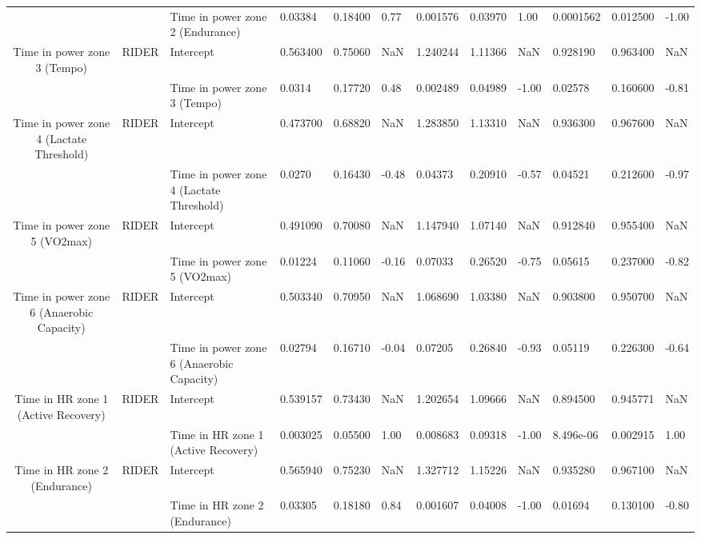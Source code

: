 \begin{tabular}{c}
                                      &       & Time in power zone 2 (Endurance) &   0.03384 &  0.18400 &  0.77 &  0.001576 &  0.03970 &  1.00 &  0.0001562 &  0.012500 & -1.00 \\
Time in power zone 3 (Tempo) & RIDER & Intercept &  0.563400 &  0.75060 &   NaN &  1.240244 &  1.11366 &   NaN &   0.928190 &  0.963400 &   NaN \\
                                      &       & Time in power zone 3 (Tempo) &    0.0314 &  0.17720 &  0.48 &  0.002489 &  0.04989 & -1.00 &    0.02578 &  0.160600 & -0.81 \\
Time in power zone 4 (Lactate Threshold) & RIDER & Intercept &  0.473700 &  0.68820 &   NaN &  1.283850 &  1.13310 &   NaN &   0.936300 &  0.967600 &   NaN \\
                                      &       & Time in power zone 4 (Lactate Threshold) &    0.0270 &  0.16430 & -0.48 &   0.04373 &  0.20910 & -0.57 &    0.04521 &  0.212600 & -0.97 \\
Time in power zone 5 (VO2max) & RIDER & Intercept &  0.491090 &  0.70080 &   NaN &  1.147940 &  1.07140 &   NaN &   0.912840 &  0.955400 &   NaN \\
                                      &       & Time in power zone 5 (VO2max) &   0.01224 &  0.11060 & -0.16 &   0.07033 &  0.26520 & -0.75 &    0.05615 &  0.237000 & -0.82 \\
Time in power zone 6 (Anaerobic Capacity) & RIDER & Intercept &  0.503340 &  0.70950 &   NaN &  1.068690 &  1.03380 &   NaN &   0.903800 &  0.950700 &   NaN \\
                                      &       & Time in power zone 6 (Anaerobic Capacity) &   0.02794 &  0.16710 & -0.04 &   0.07205 &  0.26840 & -0.93 &    0.05119 &  0.226300 & -0.64 \\
Time in HR zone 1 (Active Recovery) & RIDER & Intercept &  0.539157 &  0.73430 &   NaN &  1.202654 &  1.09666 &   NaN &   0.894500 &  0.945771 &   NaN \\
                                      &       & Time in HR zone 1 (Active Recovery) &  0.003025 &  0.05500 &  1.00 &  0.008683 &  0.09318 & -1.00 &  8.496e-06 &  0.002915 &  1.00 \\
Time in HR zone 2 (Endurance) & RIDER & Intercept &  0.565940 &  0.75230 &   NaN &  1.327712 &  1.15226 &   NaN &   0.935280 &  0.967100 &   NaN \\
                                      &       & Time in HR zone 2 (Endurance) &   0.03305 &  0.18180 &  0.84 &  0.001607 &  0.04008 & -1.00 &    0.01694 &  0.130100 & -0.80 \\

\end{tabular}
